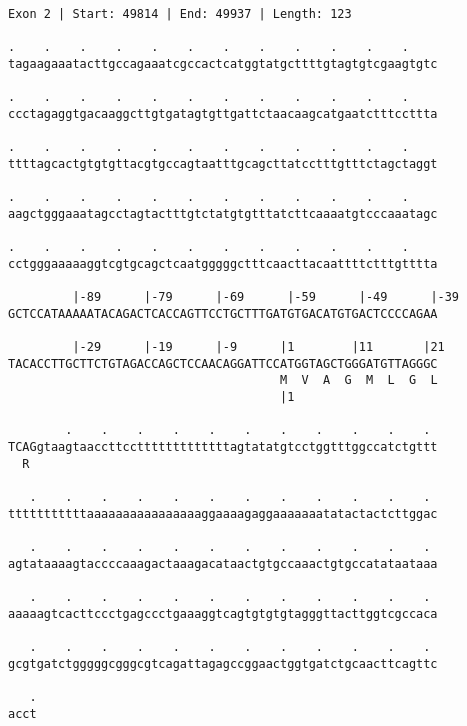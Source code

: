 \documentclass{article}
\begin{document}
\newpage
\begin{Verbatim}
Exon 2 | Start: 49814 | End: 49937 | Length: 123
 
.    .    .    .    .    .    .    .    .    .    .    .    
tagaagaaatacttgccagaaatcgccactcatggtatgcttttgtagtgtcgaagtgtc
  
.    .    .    .    .    .    .    .    .    .    .    .    
ccctagaggtgacaaggcttgtgatagtgttgattctaacaagcatgaatctttccttta
  
.    .    .    .    .    .    .    .    .    .    .    .    
ttttagcactgtgtgttacgtgccagtaatttgcagcttatcctttgtttctagctaggt
  
.    .    .    .    .    .    .    .    .    .    .    .    
aagctgggaaatagcctagtactttgtctatgtgtttatcttcaaaatgtcccaaatagc
  
.    .    .    .    .    .    .    .    .    .    .    .    
cctgggaaaaaggtcgtgcagctcaatgggggctttcaacttacaattttctttgtttta
  
         |-89      |-79      |-69      |-59      |-49      |-39
GCTCCATAAAAATACAGACTCACCAGTTCCTGCTTTGATGTGACATGTGACTCCCCAGAA
  
         |-29      |-19      |-9      |1        |11       |21
TACACCTTGCTTCTGTAGACCAGCTCCAACAGGATTCCATGGTAGCTGGGATGTTAGGGC
                                      M  V  A  G  M  L  G  L
                                      |1                    
  
        .    .    .    .    .    .    .    .    .    .    . 
TCAGgtaagtaaccttcctttttttttttttagtatatgtcctggtttggccatctgttt
  R                                                         
  
   .    .    .    .    .    .    .    .    .    .    .    . 
tttttttttttaaaaaaaaaaaaaaaaggaaaagaggaaaaaaatatactactcttggac
  
   .    .    .    .    .    .    .    .    .    .    .    . 
agtataaaagtaccccaaagactaaagacataactgtgccaaactgtgccatataataaa
  
   .    .    .    .    .    .    .    .    .    .    .    . 
aaaaagtcacttccctgagccctgaaaggtcagtgtgtgtagggttacttggtcgccaca
  
   .    .    .    .    .    .    .    .    .    .    .    . 
gcgtgatctgggggcgggcgtcagattagagccggaactggtgatctgcaacttcagttc
  
   .
acct
\end{Verbatim}
\newpage
\end{document}
